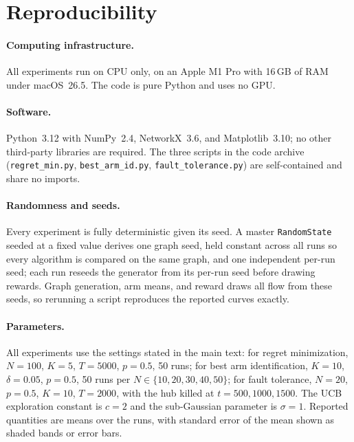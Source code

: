 \documentclass[letterpaper]{article} %
\begin{document}
\section{Reproducibility}
\label{sec:reproducibility}

\paragraph{Computing infrastructure.} All experiments run on CPU only, on an
Apple M1 Pro with 16\,GB of RAM under macOS~26.5. The code is pure Python and
uses no GPU.

\paragraph{Software.} Python~3.12 with NumPy~2.4, NetworkX~3.6, and
Matplotlib~3.10; no other third-party libraries are required. The three scripts
in the code archive (\texttt{regret\_min.py}, \texttt{best\_arm\_id.py},
\texttt{fault\_tolerance.py}) are self-contained and share no imports.

\paragraph{Randomness and seeds.} Every experiment is fully deterministic given
its seed. A master \texttt{RandomState} seeded at a fixed value derives one graph
seed, held constant across all runs so every algorithm is compared on the same
graph, and one independent per-run seed; each run reseeds the generator from its
per-run seed before drawing rewards. Graph generation, arm means, and reward
draws all flow from these seeds, so rerunning a script reproduces the reported
curves exactly.

\paragraph{Parameters.} All experiments use the settings stated in the main
text: for regret minimization, $N=100$, $K=5$, $T=5000$, $p=0.5$, 50 runs; for
best arm identification, $K=10$, $\delta=0.05$, $p=0.5$, 50 runs per $N \in
\{10,20,30,40,50\}$; for fault tolerance, $N=20$, $p=0.5$, $K=10$, $T=2000$,
with the hub killed at $t=500,1000,1500$. The UCB exploration constant is $c=2$
and the sub-Gaussian parameter is $\sigma=1$. Reported quantities are means over
the runs, with standard error of the mean shown as shaded bands or error bars.


\end{document}
